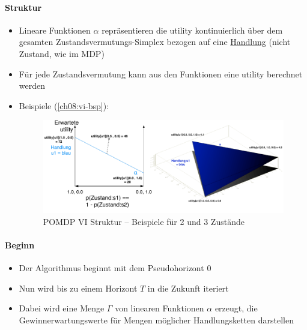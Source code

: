 \paragraph{Struktur}
\begin{itemize}
	\item Lineare Funktionen $\alpha$ repr\"asentieren die utility kontinuierlich \"uber dem gesamten Zustandsvermutungs-Simplex bezogen auf eine \underline{Handlung} (nicht Zustand, wie im MDP)
	\item F\"ur jede Zustandsvermutung kann aus den Funktionen eine utility berechnet werden
	\item Beispiele (\autoref{ch08:vi-bsp}):
	\begin{figure}[!h]
		\centering
  		\includegraphics[width=0.6\linewidth]{figures/ch08_vi-bsp.png}
  		\centering
		\caption{POMDP VI Struktur -- Beispiele für 2 und 3 Zustände}
		\label{ch08:vi-bsp}
	\end{figure}
\end{itemize}

\paragraph{Beginn}
\begin{itemize}
	\item Der Algorithmus beginnt mit dem Pseudohorizont $0$
	\item Nun wird bis zu einem Horizont $T$ in die Zukunft iteriert
	\item Dabei wird eine Menge $\Gamma$ von linearen Funktionen $\alpha$ erzeugt, die Gewinnerwartungswerte f\"ur Mengen m\"oglicher Handlungsketten darstellen
\end{itemize}

